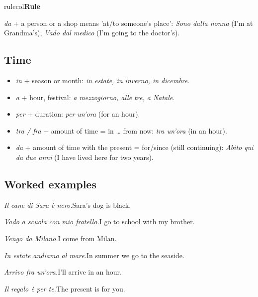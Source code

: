 \documentclass[11pt,a4paper,twoside,openright]{book}
\newcommand{\notelabel}[3]{{\sffamily\small\bfseries\color{#1}#2}\if\relax\detokenize{#3}\relax\else{\sffamily\small\bfseries\ ---\ #3}\fi\par\nopagebreak}
\begin{document}
\begin{notebox}{rulecol}\notelabel{rulecol}{Rule}{da + person}
\textit{da} + a person or a shop means 'at/to someone's place': \textit{Sono dalla nonna} (I'm at Grandma's), \textit{Vado dal medico} (I'm going to the doctor's).
\end{notebox}

\subsection{Time}\label{les:simple-prepositions:time}

\begin{itemize}
\item\relax \textit{in} + season or month: \textit{in estate, in inverno, in dicembre}.
\item\relax \textit{a} + hour, festival: \textit{a mezzogiorno, alle tre, a Natale}.
\item\relax \textit{per} + duration: \textit{per un'ora} (for an hour).
\item\relax \textit{tra / fra} + amount of time = in … from now: \textit{tra un'ora} (in an hour).
\item\relax \textit{da} + amount of time with the present = for/since (still continuing): \textit{Abito qui da due anni} (I have lived here for two years).
\end{itemize}

\subsection*{Worked examples}
\begin{examples}
\item\relax \textit{Il cane di Sara è nero.}\newline Sara's dog is black.
\item\relax \textit{Vado a scuola con mio fratello.}\newline I go to school with my brother.
\item\relax \textit{Vengo da Milano.}\newline I come from Milan.
\item\relax \textit{In estate andiamo al mare.}\newline In summer we go to the seaside.
\item\relax \textit{Arrivo fra un'ora.}\newline I'll arrive in an hour.
\item\relax \textit{Il regalo è per te.}\newline The present is for you.
\end{examples}
\end{document}

